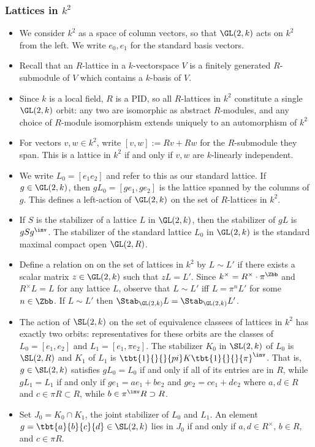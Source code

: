 \documentclass{book}
\begin{document}
\subsubsection*{Lattices in $k^2$}
\begin{itemize}
    \item We consider $k^2$ as a space of column vectors, so that $\GL(2,k)$ acts on $k^2$ from the left. We write $e_0,e_1$ for the standard basis vectors.
    \item Recall that an $R$-lattice in a $k$-vectorspace $V$ is a finitely generated $R$-submodule of $V$ which contains a $k$-basis of $V$.
    \item Since $k$ is a local field, $R$ is a PID, so all $R$-lattices in $k^2$ constitute a single $\GL(2,k)$ orbit: any two are isomorphic as abstract $R$-modules, and any choice of $R$-module isomorphism extends uniquely to an automorphism of $k^2$
    \item For vectors $v,w \in k^2$, write $[v,w]:= Rv+Rw$ for the $R$-submodule they span. This is a lattice in $k^2$ if and only if $v,w$ are $k$-linearly independent.
    \item We write $L_0 = [e_1e_2]$ and refer to this as our standard lattice. If $g \in \GL(2,k)$, then $gL_0 = [ge_1,ge_2]$ is the lattice spanned by the columns of $g$. This defines a left-action of $\GL(2,k)$ on the set of $R$-lattices in $k^2$.
    \item If $S$ is the stabilizer of a lattice $L$ in $\GL(2,k)$, then the stabilizer of $gL$ is $gSg^\inv$. The stabilizer of the standard lattice $L_0$ in $\GL(2,k)$ is the standard maximal compact open $\GL(2,R)$.
    \item Define a relation on on the set of lattices in $k^2$ by $L\sim L'$ if there exists a scalar matrix $z \in \GL(2,k)$ such that $zL=L'$. Since $k^\times = R^\times \cdot \pi^\Zbb$ and $R^\times L= L$ for any lattice $L$, observe that $L\sim L'$ iff $L = \pi^n L'$ for some $n\in \Zbb$. If $L\sim L'$ then $\Stab_{\GL(2,k)} L =\Stab_{\GL(2,k)} L'$.
    \item The action of $\SL(2,k)$ on the set of equivalence classees of lattices in $k^2$ has exactly two orbits: representatives for these orbits are the classes of $L_0 = [e_1,e_2]$ and $L_1 = [e_1,\pi e_2]$. The stabilizer $K_0$ in $\SL(2,k)$ of $L_0$ is $\SL(2,R)$ and $K_1$ of $L_1$ is $\tbt{1}{}{}{pi}K \tbt{1}{}{}{\pi}^\inv$. That is, $g \in \SL(2,k)$ satisfies $gL_0 = L_0$ if and only if all of its entries are in $R$, while $gL_1 = L_1$ if and only if $ge_1 = a e_1 + b e_2$ and $ge_2 = c e_1 +d e_2$ where $a,d \in R$ and $c \in \pi R\subset R$, while $b \in \pi^\inv R\supset R$.
    \item Set $J_0 = K_0 \cap K_1$, the joint stabilizer of $L_0$ and $L_1$. An element $g = \tbt{a}{b}{c}{d} \in \SL(2,k)$ lies in $J_0$ if and only if $a,d \in R^\times$, $b \in R$, and $c \in \pi R$.
\end{itemize}
\end{document}
